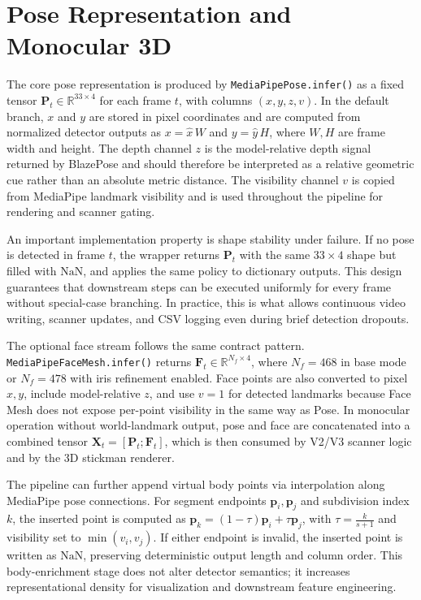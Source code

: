 \documentclass[11pt,a4paper]{article}
\begin{document}
\section{Pose Representation and Monocular 3D}
The core pose representation is produced by \texttt{MediaPipePose.infer()} as a fixed tensor \(\mathbf{P}_t \in \mathbb{R}^{33 \times 4}\) for each frame \(t\), with columns \((x,y,z,v)\). In the default branch, \(x\) and \(y\) are stored in pixel coordinates and are computed from normalized detector outputs as \(x = \hat{x}\,W\) and \(y = \hat{y}\,H\), where \(W,H\) are frame width and height. The depth channel \(z\) is the model-relative depth signal returned by BlazePose and should therefore be interpreted as a relative geometric cue rather than an absolute metric distance. The visibility channel \(v\) is copied from MediaPipe landmark visibility and is used throughout the pipeline for rendering and scanner gating.

An important implementation property is shape stability under failure. If no pose is detected in frame \(t\), the wrapper returns \(\mathbf{P}_t\) with the same \(33 \times 4\) shape but filled with \(\mathrm{NaN}\), and applies the same policy to dictionary outputs. This design guarantees that downstream steps can be executed uniformly for every frame without special-case branching. In practice, this is what allows continuous video writing, scanner updates, and CSV logging even during brief detection dropouts.

The optional face stream follows the same contract pattern. \texttt{MediaPipeFaceMesh.infer()} returns \(\mathbf{F}_t \in \mathbb{R}^{N_f \times 4}\), where \(N_f=468\) in base mode or \(N_f=478\) with iris refinement enabled. Face points are also converted to pixel \(x,y\), include model-relative \(z\), and use \(v=1\) for detected landmarks because Face Mesh does not expose per-point visibility in the same way as Pose. In monocular operation without world-landmark output, pose and face are concatenated into a combined tensor \(\mathbf{X}_t=[\mathbf{P}_t;\mathbf{F}_t]\), which is then consumed by V2/V3 scanner logic and by the 3D stickman renderer.

The pipeline can further append virtual body points via interpolation along MediaPipe pose connections. For segment endpoints \(\mathbf{p}_i,\mathbf{p}_j\) and subdivision index \(k\), the inserted point is computed as \(\mathbf{p}_{k}=(1-\tau)\mathbf{p}_i+\tau\mathbf{p}_j\), with \(\tau=\frac{k}{s+1}\) and visibility set to \(\min(v_i,v_j)\). If either endpoint is invalid, the inserted point is written as \(\mathrm{NaN}\), preserving deterministic output length and column order. This body-enrichment stage does not alter detector semantics; it increases representational density for visualization and downstream feature engineering.
\end{document}

